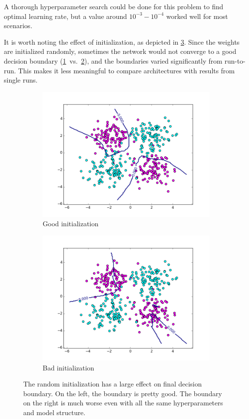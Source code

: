 A thorough hyperparameter search could be done for this problem to find optimal learning rate, but a value around $10^{-3} - 10^{-4}$ worked well for most scenarios.

It is worth noting the effect of initialization, as depicted in \cref{fig:init}.
Since the weights are initialized randomly, sometimes the network would not converge to a good decision boundary (\cref{fig:sub_init1}~vs.~\cref{fig:sub_init2}), and the boundaries varied significantly from run-to-run.
This makes it less meaningful to compare architectures with results from single runs.

\begin{figure}
\centering
\begin{subfigure}{.25\textwidth}
  \centering
  \includegraphics[width=.9\linewidth]{figures/1_4_data4_2hl_large_good}
  \caption{Good initialization}
  \label{fig:sub_init1}
\end{subfigure}%
\begin{subfigure}{.25\textwidth}
  \centering
  \includegraphics[width=.9\linewidth]{figures/1_4_data4_2hl_large_bad}
  \caption{Bad initialization}
  \label{fig:sub_init2}
\end{subfigure}
\caption{The random initialization has a large effect on final decision boundary. On the left, the boundary is pretty good. The boundary on the right is much worse even with all the same hyperparameters and model structure.}
\label{fig:init}
\end{figure}

